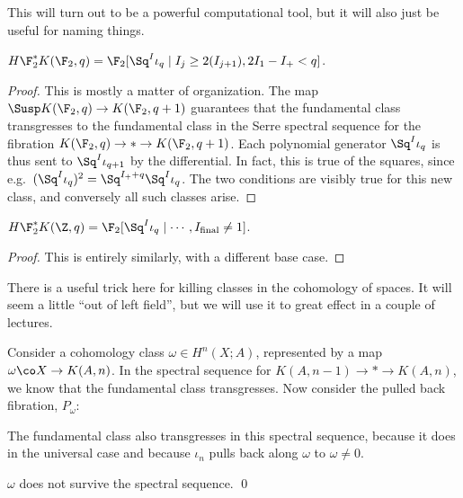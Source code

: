 This will turn out to be a powerful computational tool, but it will also just be useful for naming things.

\begin{theorem}
$H\F_2^* K(\F_2, q) = \F_2[\Sq^I \iota_q \mid I_j \ge 2(I_{j+1}), 2I_1 - I_+ < q]$.
\end{theorem}
\begin{proof}
This is mostly a matter of organization.  The map $\Susp K(\F_2, q) \to K(\F_2, q+1)$ guarantees that the fundamental class transgresses to the fundamental class in the Serre spectral sequence for the fibration $K(\F_2, q) \to * \to K(\F_2, q+1)$.  Each polynomial generator $\Sq^I \iota_q$ is thus sent to $\Sq^I \iota_{q+1}$ by the differential.  In fact, this is true of the squares, since e.g.\ $(\Sq^I \iota_q)^2 = \Sq^{I_+ + q} \Sq^I \iota_q$.  The two conditions are visibly true for this new class, and conversely all such classes arise.
\end{proof}

\begin{theorem}
$H\F_2^* K(\Z, q) = \F_2[\Sq^I \iota_q \mid \cdots, I_{\text{final}} \ne 1]$.
\end{theorem}
\begin{proof}
This is entirely similarly, with a different base case.
\end{proof}

There is a useful trick here for killing classes in the cohomology of spaces.  It will seem a little ``out of left field'', but we will use it to great effect in a couple of lectures.

Consider a cohomology class $\omega \in H^n(X; A)$, represented by a map $\omega\co X \to K(A, n)$.  In the spectral sequence for $K(A, n-1) \to * \to K(A, n)$, we know that the fundamental class transgresses.  Now consider the pulled back fibration, $P_\omega$:
\begin{center}
\end{center}
The fundamental class also transgresses in this spectral sequence, because it does in the universal case and because $\iota_n$ pulls back along $\omega$ to $\omega \ne 0$.

\begin{corollary}
$\omega$ does not survive the spectral sequence. \qed
\end{corollary}

